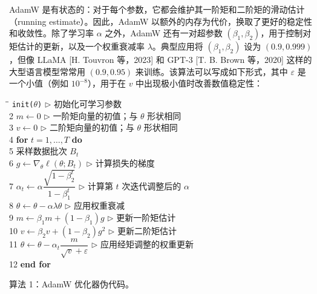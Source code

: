 AdamW 是有状态的：对于每个参数，它都会维护其一阶矩和二阶矩的滑动估计（running estimate）。因此，AdamW 以额外的内存为代价，换取了更好的稳定性和收敛性。除了学习率 $\alpha$ 之外，AdamW 还有一对超参数 $(\beta_1, \beta_2)$，用于控制对矩估计的更新，以及一个权重衰减率 $\lambda$。典型应用将 $(\beta_1, \beta_2)$ 设为 $(0.9, 0.999)$，但像 LLaMA [H. Touvron 等，2023] 和 GPT-3 [T. B. Brown 等，2020] 这样的大型语言模型常常用 $(0.9, 0.95)$ 来训练。该算法可以写成如下形式，其中 $\varepsilon$ 是一个小值（例如 $10^{-8}$），用于在 $v$ 中出现极小值时改善数值稳定性：

\begin{tcolorbox}[colback=white,colframe=black,boxrule=0.6pt,arc=1pt,
  left=3mm,right=3mm,top=2mm,bottom=2mm,
  title={\textbf{算法 1：AdamW 优化器}},fonttitle=\normalfont,coltitle=black,
  colbacktitle=white]
\begin{tabbing}
\hspace{0.6cm}\=\hspace{6.2cm}\= \> \texttt{init($\theta$)} \> $\triangleright$ 初始化可学习参数 \\
2 \> $m \leftarrow 0$ \> $\triangleright$ 一阶矩向量的初值；与 $\theta$ 形状相同 \\
3 \> $v \leftarrow 0$ \> $\triangleright$ 二阶矩向量的初值；与 $\theta$ 形状相同 \\
4 \> \textbf{for} $t = 1, \dots, T$ \textbf{do} \> \\
5 \> \quad 采样数据批次 $B_t$ \> \\
6 \> \quad $g \leftarrow \nabla_\theta \ell(\theta; B_t)$ \> $\triangleright$ 计算损失的梯度 \\
7 \> \quad $\alpha_t \leftarrow \alpha \dfrac{\sqrt{1-\beta_2^t}}{1-\beta_1^t}$ \> $\triangleright$ 计算第 $t$ 次迭代调整后的 $\alpha$ \\[6pt]
8 \> \quad $\theta \leftarrow \theta - \alpha\lambda\theta$ \> $\triangleright$ 应用权重衰减 \\
9 \> \quad $m \leftarrow \beta_1 m + (1-\beta_1) g$ \> $\triangleright$ 更新一阶矩估计 \\
10 \> \quad $v \leftarrow \beta_2 v + (1-\beta_2) g^2$ \> $\triangleright$ 更新二阶矩估计 \\
11 \> \quad $\theta \leftarrow \theta - \alpha_t \dfrac{m}{\sqrt{v}+\varepsilon}$ \> $\triangleright$ 应用经矩调整的权重更新 \\[6pt]
12 \> \textbf{end for} \> \\
\end{tabbing}
\begin{center}\small 算法 1：AdamW 优化器伪代码。\end{center}
\end{tcolorbox}

